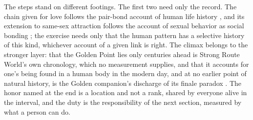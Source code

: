 The steps stand on different footings. The first two need only the record. The
chain given for love follows the pair-bond account of human life history
\cite{Kaplan00,Fletcher15}, and its extension to same-sex attraction follows
the account of sexual behavior as social bonding \cite{BarronHare20}; the
exercise needs only that the human pattern has a selective history of this
kind, whichever account of a given link is right. The climax belongs to the
stronger layer: that the Golden Point lies only centuries ahead is Strong
Route World's own chronology, which no measurement supplies, and that it
accounts for one's being found in a human body in the modern day, and at no
earlier point of natural history, is the Golden companion's discharge of its
finale paradox \cite{GoldenReasoning}. The honor named at the end is a
location and not a rank, shared by everyone alive in the interval, and the
duty is the responsibility of the next section, measured by what a person can
do.

